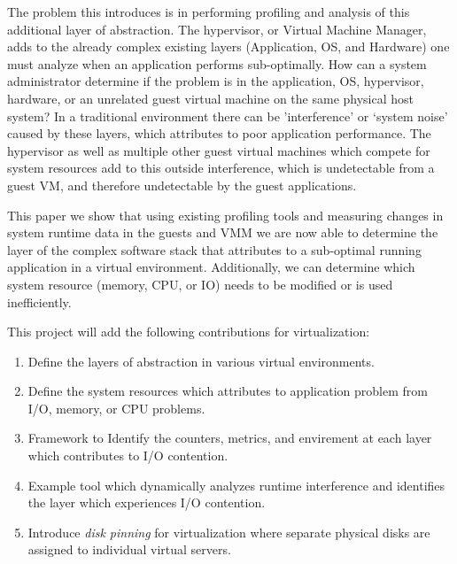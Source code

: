 \indent The problem this introduces is in performing profiling and analysis of this additional layer of abstraction.  The hypervisor, or Virtual Machine Manager, adds to the already complex existing layers (Application, OS, and Hardware) one must analyze when an application performs sub-optimally.  How can a system administrator determine if the problem is in the application, OS, hypervisor, hardware, or an unrelated guest virtual machine on the same physical host system?  In a traditional environment there can be 'interference' \cite{paul}or ‘system noise' caused by these layers, which attributes to poor application performance.  The hypervisor as well as multiple other guest virtual machines which compete for system resources add to this outside interference, which is undetectable from a guest VM, and therefore undetectable by the guest applications.

\indent This paper we show that using existing profiling tools and measuring changes in system runtime data in the guests and VMM we are now able to determine the layer of the complex software stack that attributes to a sub-optimal running application in a virtual environment.  Additionally, we can determine which system resource (memory, CPU, or IO) needs to be modified or is used inefficiently.

\indent This project will add the following contributions for virtualization:
\begin{enumerate}
\item Define the layers of abstraction in various virtual environments.
\item Define the system resources which attributes to application problem from I/O, memory, or CPU problems.
\item Framework to Identify the counters, metrics, and envirement at each layer which contributes to I/O contention.
\item Example tool which dynamically analyzes runtime interference and identifies the layer which experiences I/O contention.
\item Introduce \emph{disk pinning} for virtualization where separate physical disks are assigned to individual virtual servers.
\end{enumerate}


